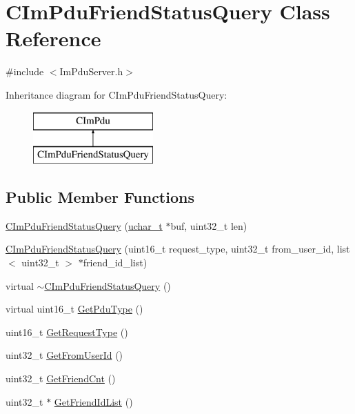 \hypertarget{class_c_im_pdu_friend_status_query}{}\section{C\+Im\+Pdu\+Friend\+Status\+Query Class Reference}
\label{class_c_im_pdu_friend_status_query}


{\ttfamily \#include $<$Im\+Pdu\+Server.\+h$>$}

Inheritance diagram for C\+Im\+Pdu\+Friend\+Status\+Query\+:\begin{figure}[H]
\begin{center}
\leavevmode
\includegraphics[height=2.000000cm]{class_c_im_pdu_friend_status_query}
\end{center}
\end{figure}
\subsection*{Public Member Functions}
\begin{DoxyCompactItemize}
\item 
\hyperlink{class_c_im_pdu_friend_status_query_ae4dd6891ee17dd97a05676606b6e8aa6}{C\+Im\+Pdu\+Friend\+Status\+Query} (\hyperlink{base_2ostype_8h_a124ea0f8f4a23a0a286b5582137f0b8d}{uchar\+\_\+t} $\ast$buf, uint32\+\_\+t len)
\item 
\hyperlink{class_c_im_pdu_friend_status_query_a103571428fe8e86d45cc3b2c04bcc930}{C\+Im\+Pdu\+Friend\+Status\+Query} (uint16\+\_\+t request\+\_\+type, uint32\+\_\+t from\+\_\+user\+\_\+id, list$<$ uint32\+\_\+t $>$ $\ast$friend\+\_\+id\+\_\+list)
\item 
virtual \hyperlink{class_c_im_pdu_friend_status_query_abf15a439d45cba2e7f14c81047852387}{$\sim$\+C\+Im\+Pdu\+Friend\+Status\+Query} ()
\item 
virtual uint16\+\_\+t \hyperlink{class_c_im_pdu_friend_status_query_aa44c6d6b58b23138386a0b45e5c62964}{Get\+Pdu\+Type} ()
\item 
uint16\+\_\+t \hyperlink{class_c_im_pdu_friend_status_query_aafb463dce78199c0b4b0c3c76a245e68}{Get\+Request\+Type} ()
\item 
uint32\+\_\+t \hyperlink{class_c_im_pdu_friend_status_query_a260f5fc74ec419360ab2535def29a150}{Get\+From\+User\+Id} ()
\item 
uint32\+\_\+t \hyperlink{class_c_im_pdu_friend_status_query_a8362e69268eac05b4ec8710a32d61d7e}{Get\+Friend\+Cnt} ()
\item 
uint32\+\_\+t $\ast$ \hyperlink{class_c_im_pdu_friend_status_query_a08c03ffd34eda38db61df1b163e24778}{Get\+Friend\+Id\+List} ()
\end{DoxyCompactItemize}
